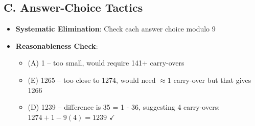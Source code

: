 \documentclass[]{article}
\begin{document}
\begin{tacticalbox}
\subsection*{C. Answer-Choice Tactics}
\begin{itemize}[leftmargin=*]
    \item \textbf{Systematic Elimination}: Check each answer choice modulo 9
    \item \textbf{Reasonableness Check}: 
    \begin{itemize}
        \item (A) 1 -- too small, would require 141+ carry-overs
        \item (E) 1265 -- too close to 1274, would need $\approx 1$ carry-over but that gives 1266
        \item (D) 1239 -- difference is 35 = 1 - 36, suggesting 4 carry-overs: $1274 + 1 - 9(4) = 1239$ $\checkmark$
    \end{itemize}
\end{itemize}
\end{tacticalbox}
\end{document}
